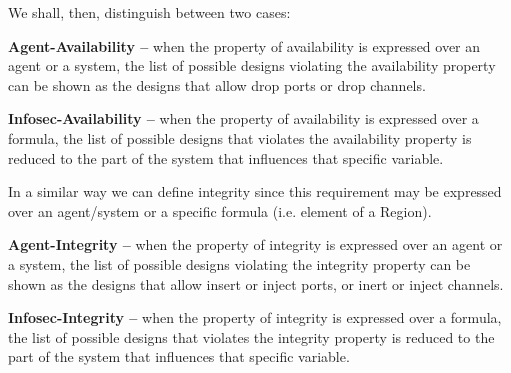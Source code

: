 We shall, then, distinguish between two cases:
\begin{definition}{\bf Agent-Availability --}\label{def:agent-a}
when the property of availability is expressed over
	an agent or a system, the list of possible designs violating the
	availability property can be shown as the designs that allow drop ports
	or drop channels. 
\end{definition}
\begin{definition}{\bf Infosec-Availability --}\label{def:infosec-c}
when the property of availability is expressed
	over a formula, the list of possible designs that violates the
	availability property is reduced to the part of the system that
	influences that specific variable.
\end{definition}

In a similar way we can define integrity since this requirement may 
be expressed over an agent/system or a specific formula (i.e. element of a Region).

\begin{definition}{\bf Agent-Integrity --}\label{def:agent-a}
when the property of integrity is expressed over
	an agent or a system, the list of possible designs violating the
	integrity property can be shown as the designs that allow insert or inject ports,
	or inert or inject channels. 
\end{definition}
\begin{definition}{\bf Infosec-Integrity --}\label{def:infosec-c}
when the property of integrity is expressed
	over a formula, the list of possible designs that violates the
	integrity property is reduced to the part of the system that
	influences that specific variable.
\end{definition}

